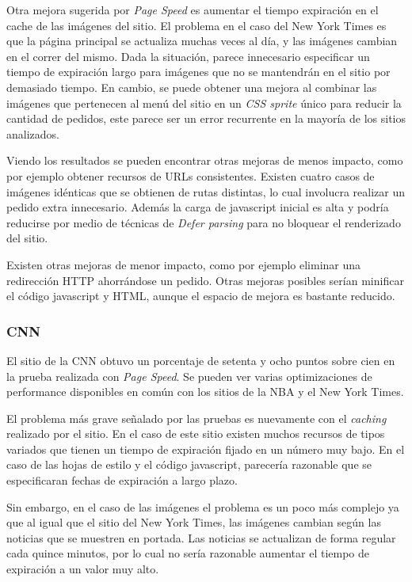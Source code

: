 Otra mejora sugerida por \emph{Page Speed} es aumentar el tiempo expiración en el cache de las imágenes del sitio. El problema en el caso del New York Times es que la página
principal se actualiza muchas veces al día, y las imágenes cambian en el correr del mismo. Dada la situación, parece innecesario especificar un tiempo de expiración largo para
imágenes que no se mantendrán en el sitio por demasiado tiempo. En cambio, se puede obtener una mejora al combinar las imágenes que pertenecen al menú del sitio en un
\emph{CSS sprite} único para reducir la cantidad de pedidos, este parece ser un error recurrente en la mayoría de los sitios analizados.

Viendo los resultados se pueden encontrar otras mejoras de menos impacto, como por ejemplo obtener recursos de URLs consistentes. Existen cuatro casos de imágenes idénticas
que se obtienen de rutas distintas, lo cual involucra realizar un pedido extra innecesario. Además la carga de javascript inicial es alta y podría reducirse por medio de técnicas de
\emph{Defer parsing} para no bloquear el renderizado del sitio.

Existen otras mejoras de menor impacto, como por ejemplo eliminar una redirección HTTP ahorrándose un pedido.
Otras mejoras posibles serían minificar el código javascript y HTML, aunque el espacio de mejora es bastante reducido.

\subsubsection{CNN}

El sitio de la CNN obtuvo un porcentaje de setenta y ocho puntos sobre cien en la prueba realizada con \emph{Page Speed}. Se pueden ver varias optimizaciones de performance
disponibles en común con los sitios de la NBA y el New York Times.

El problema más grave señalado por las pruebas es nuevamente con el \emph{caching} realizado por el sitio. En el caso de este sitio existen muchos recursos de tipos variados
que tienen un tiempo de expiración fijado en un número muy bajo. En el caso de las hojas de estilo y el código javascript, parecería razonable que se especificaran fechas de
expiración a largo plazo.

Sin embargo, en el caso de las imágenes el problema es un poco más complejo ya que al igual que el sitio del New York Times, las imágenes cambian según las
noticias que se muestren en portada. Las noticias se actualizan de forma regular cada quince minutos, por lo cual no sería razonable aumentar el tiempo de expiración a un valor muy
alto. 

